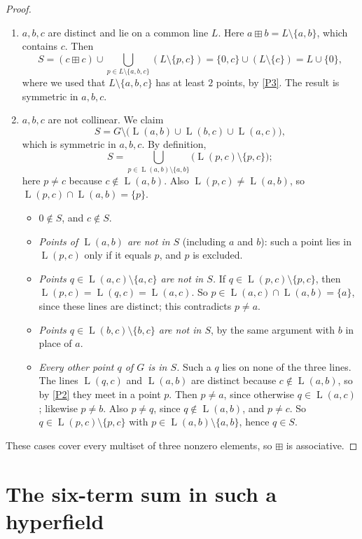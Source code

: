 \documentclass[11pt]{article}
\theoremstyle{definition}
\theoremstyle{remark}
\newcommand{\bp}{\boxplus}
\DeclareMathOperator{\Ln}{L}
\begin{document}
\begin{proof}
\begin{enumerate}[label=\textup{Case \arabic*.},ref=\arabic*,leftmargin=*]
\item\label{case3} $a,b,c$ are distinct and lie on a common line $L$. Here $a\bp b=L\setminus\{a,b\}$, which contains $c$. Then
\[
S=(c\bp c)\cup\bigcup_{p\in L\setminus\{a,b,c\}}(L\setminus\{p,c\})=\{0,c\}\cup(L\setminus\{c\})=L\cup\{0\},
\]
where we used that $L\setminus\{a,b,c\}$ has at least $2$ points, by \ref{P3}. The result is symmetric in $a,b,c$.

\item\label{case4} $a,b,c$ are not collinear. We claim
\[
S=G\setminus\bigl(\Ln(a,b)\cup\Ln(b,c)\cup\Ln(a,c)\bigr),
\]
which is symmetric in $a,b,c$. By definition,
\[
S=\bigcup_{p\in\Ln(a,b)\setminus\{a,b\}}\bigl(\Ln(p,c)\setminus\{p,c\}\bigr);
\]
here $p\neq c$ because $c\notin\Ln(a,b)$. Also $\Ln(p,c)\neq\Ln(a,b)$, so $\Ln(p,c)\cap\Ln(a,b)=\{p\}$.
\begin{itemize}[nosep]
\item $0\notin S$, and $c\notin S$.
\item \emph{Points of $\Ln(a,b)$ are not in $S$} (including $a$ and $b$): such a point lies in $\Ln(p,c)$ only if it equals $p$, and $p$ is excluded.
\item \emph{Points $q\in\Ln(a,c)\setminus\{a,c\}$ are not in $S$.} If $q\in\Ln(p,c)\setminus\{p,c\}$, then $\Ln(p,c)=\Ln(q,c)=\Ln(a,c)$. So $p\in\Ln(a,c)\cap\Ln(a,b)=\{a\}$, since these lines are distinct; this contradicts $p\neq a$.
\item \emph{Points $q\in\Ln(b,c)\setminus\{b,c\}$ are not in $S$}, by the same argument with $b$ in place of $a$.
\item \emph{Every other point $q$ of $G$ is in $S$.} Such a $q$ lies on none of the three lines. The lines $\Ln(q,c)$ and $\Ln(a,b)$ are distinct because $c\notin\Ln(a,b)$, so by \ref{P2} they meet in a point $p$. Then $p\neq a$, since otherwise $q\in\Ln(a,c)$; likewise $p\neq b$. Also $p\neq q$, since $q\notin\Ln(a,b)$, and $p\neq c$. So $q\in\Ln(p,c)\setminus\{p,c\}$ with $p\in\Ln(a,b)\setminus\{a,b\}$, hence $q\in S$.
\end{itemize}
\end{enumerate}
These cases cover every multiset of three nonzero elements, so $\bp$ is associative.
\end{proof}

\section{The six-term sum in such a hyperfield}
\end{document}
